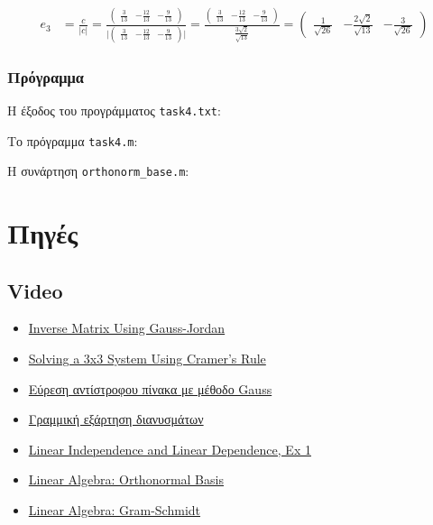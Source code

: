 \documentclass[12pt, fleqn, leqno]{extreport}
\begin{document}
\begin{equation}
    \begin{split}
        e_{3} &= \frac{c}{\vert c \vert} =
        \frac{
            \begin{pmatrix}
                \frac{3}{13} & -\frac{12}{13} & -\frac{9}{13}
            \end{pmatrix}
        }{
            \vert
            \begin{pmatrix}
                \frac{3}{13} & -\frac{12}{13} & -\frac{9}{13}
            \end{pmatrix}
            \vert
        } =
        \frac{
            \begin{pmatrix}
                \frac{3}{13} & -\frac{12}{13} & -\frac{9}{13}
            \end{pmatrix}
        }{
            \frac{3\sqrt{2}}{\sqrt{13}}
        } =
        \begin{pmatrix}
            \frac{1}{\sqrt{26}} & -\frac{2\sqrt{2}}{\sqrt{13}} & -\frac{3}{\sqrt{26}}
        \end{pmatrix}
    \end{split}
\end{equation}

\newpage
\subsection{Πρόγραμμα}

Η έξοδος του προγράμματος \lstinline[language={}]{task4.txt}:


Το πρόγραμμα \lstinline[language={}]{task4.m}:


Η συνάρτηση \lstinline[language={}]{orthonorm_base.m}:


\chapter{Πηγές}
\newpage

\section{Video}
\begin{itemize}
    \item \href{https://www.youtube.com/watch?v=cJg2AuSFdjw}{Inverse Matrix Using Gauss-Jordan}
    \item \href{https://youtu.be/X5rDjbp0t6s}{Solving a 3x3 System Using Cramer's Rule}
    \item \href{https://youtu.be/0vB1sgebS9c}{Εύρεση αντίστροφου πίνακα με μέθοδο Gauss}
    \item \href{https://youtu.be/Gmt1fmlrEto}{Γραμμική εξάρτηση διανυσμάτων}
    \item \href{https://youtu.be/yLi8RxqfowA}{Linear Independence and Linear Dependence, Ex 1}
    \item \href{https://www.youtube.com/watch?v=ZJu26chXEiw}{Linear Algebra: Orthonormal Basis}
    \item \href{https://www.youtube.com/watch?v=Aslf3KGq2UE}{Linear Algebra: Gram-Schmidt}
\end{itemize}
\end{document}
